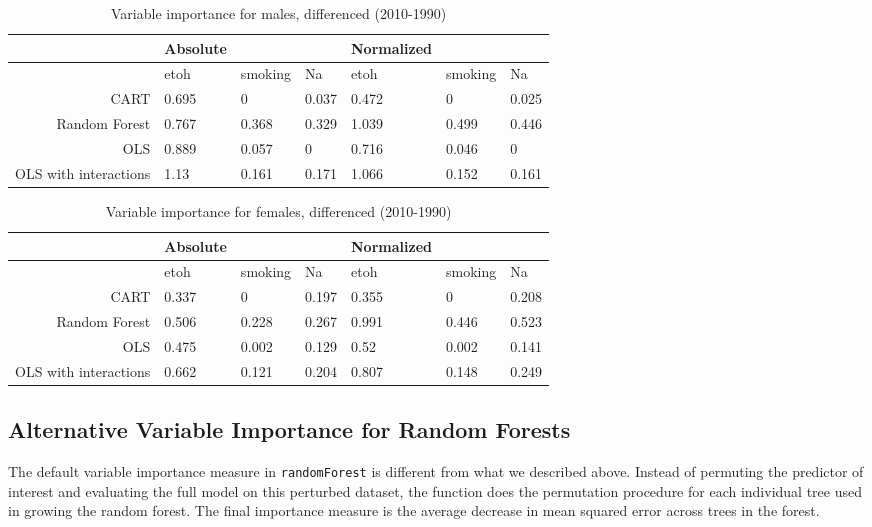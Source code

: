\documentclass[11pt]{article}\usepackage[]{graphicx}\usepackage[]{color}
\begin{document}
 
\begin{table}[ht]
\centering
\begin{tabular}{r|lll|lll}
   \hline
 & Absolute &  &  & Normalized &  &  \\ 
   \hline
   & etoh & smoking & Na & etoh & smoking & Na \\ 
   \hline
CART & 0.695 & 0 & 0.037 & 0.472 & 0 & 0.025 \\ 
  Random Forest & 0.767 & 0.368 & 0.329 & 1.039 & 0.499 & 0.446 \\ 
  OLS & 0.889 & 0.057 & 0 & 0.716 & 0.046 & 0 \\ 
  OLS with interactions & 1.13 & 0.161 & 0.171 & 1.066 & 0.152 & 0.161 \\ 
   \hline
\end{tabular}
\caption{Variable importance for males, differenced (2010-1990)} 
\end{table}
\begin{table}[ht]
\centering
\begin{tabular}{r|lll|lll}
   \hline
 & Absolute &  &  & Normalized &  &  \\ 
   \hline
   & etoh & smoking & Na & etoh & smoking & Na \\ 
   \hline
CART & 0.337 & 0 & 0.197 & 0.355 & 0 & 0.208 \\ 
  Random Forest & 0.506 & 0.228 & 0.267 & 0.991 & 0.446 & 0.523 \\ 
  OLS & 0.475 & 0.002 & 0.129 & 0.52 & 0.002 & 0.141 \\ 
  OLS with interactions & 0.662 & 0.121 & 0.204 & 0.807 & 0.148 & 0.249 \\ 
   \hline
\end{tabular}
\caption{Variable importance for females, differenced (2010-1990)} 
\end{table}


\subsection{Alternative Variable Importance for Random Forests}
The default variable importance measure in \texttt{randomForest} is different from what we described above.
Instead of permuting the predictor of interest and evaluating the full model on this perturbed dataset, the function does the permutation procedure for each individual tree used in growing the random forest.
The final importance measure is the average decrease in mean squared error across trees in the forest.
\end{document}
